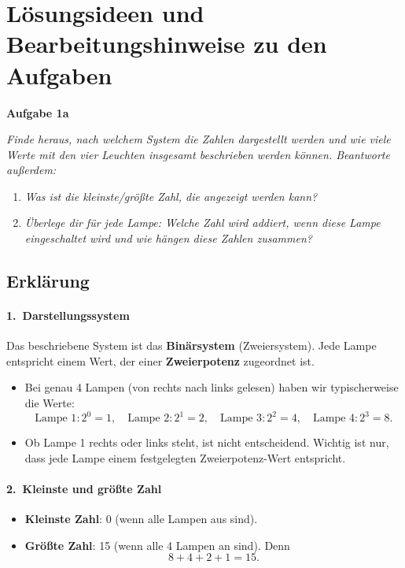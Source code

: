 \documentclass[a4paper,12pt]{article}
\begin{document}
\section*{Lösungsideen und Bearbeitungshinweise zu den Aufgaben}

\textbf{Aufgabe 1a}

\emph{Finde heraus, nach welchem System die Zahlen dargestellt werden und wie viele Werte mit den vier Leuchten insgesamt beschrieben werden können. Beantworte außerdem:}
\begin{enumerate}
  \item \emph{Was ist die kleinste/größte Zahl, die angezeigt werden kann?}
    \item \emph{Überlege dir für jede Lampe: Welche Zahl wird addiert, wenn diese Lampe eingeschaltet wird und wie hängen diese Zahlen zusammen?}
    \end{enumerate}

    \subsection*{Erklärung}

    \paragraph{1.\ Darstellungssystem}
    Das beschriebene System ist das \textbf{Binärsystem} (Zweiersystem). Jede Lampe entspricht einem Wert, der einer \textbf{Zweierpotenz} zugeordnet ist.

    \begin{itemize}
     \item Bei genau 4 Lampen (von rechts nach links gelesen) haben wir typischerweise die Werte:
      \[
         \text{Lampe 1} : 2^0 = 1,\quad
            \text{Lampe 2} : 2^1 = 2,\quad
               \text{Lampe 3} : 2^2 = 4,\quad
                  \text{Lampe 4} : 2^3 = 8.
                   \]
                    \item Ob Lampe 1 rechts oder links steht, ist nicht entscheidend. Wichtig ist nur, dass jede Lampe einem festgelegten Zweierpotenz-Wert entspricht.
                    \end{itemize}

                    \paragraph{2.\ Kleinste und größte Zahl}
                    \begin{itemize}
                     \item \textbf{Kleinste Zahl}: 0 (wenn alle Lampen aus sind).
                      \item \textbf{Größte Zahl}: 15 (wenn alle 4 Lampen an sind). Denn
                       \[
                          8 + 4 + 2 + 1 = 15.
                           \]
                           \end{itemize}
\end{document}
